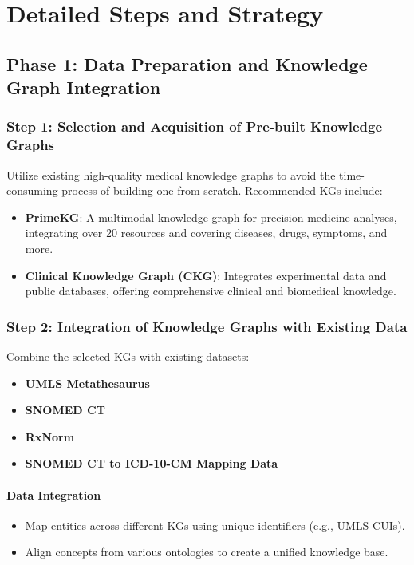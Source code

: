 \documentclass[12pt, a4paper]{article}
\begin{document}
\section{Detailed Steps and Strategy}

\subsection{Phase 1: Data Preparation and Knowledge Graph Integration}

\subsubsection{Step 1: Selection and Acquisition of Pre-built Knowledge Graphs}

Utilize existing high-quality medical knowledge graphs to avoid the time-consuming process of building one from scratch. Recommended KGs include:

\begin{itemize}
    \item \textbf{PrimeKG}: A multimodal knowledge graph for precision medicine analyses, integrating over 20 resources and covering diseases, drugs, symptoms, and more.
    \item \textbf{Clinical Knowledge Graph (CKG)}: Integrates experimental data and public databases, offering comprehensive clinical and biomedical knowledge.
\end{itemize}

\subsubsection{Step 2: Integration of Knowledge Graphs with Existing Data}

Combine the selected KGs with existing datasets:

\begin{itemize}
    \item \textbf{UMLS Metathesaurus}
    \item \textbf{SNOMED CT}
    \item \textbf{RxNorm}
    \item \textbf{SNOMED CT to ICD-10-CM Mapping Data}
\end{itemize}

\paragraph{Data Integration}

\begin{itemize}
    \item Map entities across different KGs using unique identifiers (e.g., UMLS CUIs).
    \item Align concepts from various ontologies to create a unified knowledge base.
\end{itemize}
\end{document}
